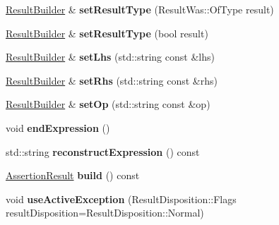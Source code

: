 \begin{DoxyCompactItemize}
\item 
\hypertarget{classCatch_1_1ResultBuilder_af896e372db9d7fc90ddeceff3ad110d0}{
\hyperlink{classCatch_1_1ResultBuilder}{ResultBuilder} \& {\bfseries setResultType} (ResultWas::OfType result)}
\label{classCatch_1_1ResultBuilder_af896e372db9d7fc90ddeceff3ad110d0}

\item 
\hypertarget{classCatch_1_1ResultBuilder_ae504348b073d0360bfd5fc33347ec689}{
\hyperlink{classCatch_1_1ResultBuilder}{ResultBuilder} \& {\bfseries setResultType} (bool result)}
\label{classCatch_1_1ResultBuilder_ae504348b073d0360bfd5fc33347ec689}

\item 
\hypertarget{classCatch_1_1ResultBuilder_a5de584deec90fc6b7cc5bcf9eb636442}{
\hyperlink{classCatch_1_1ResultBuilder}{ResultBuilder} \& {\bfseries setLhs} (std::string const \&lhs)}
\label{classCatch_1_1ResultBuilder_a5de584deec90fc6b7cc5bcf9eb636442}

\item 
\hypertarget{classCatch_1_1ResultBuilder_aaeb41a00cf352c7a0bcf75a0ded0a4a2}{
\hyperlink{classCatch_1_1ResultBuilder}{ResultBuilder} \& {\bfseries setRhs} (std::string const \&rhs)}
\label{classCatch_1_1ResultBuilder_aaeb41a00cf352c7a0bcf75a0ded0a4a2}

\item 
\hypertarget{classCatch_1_1ResultBuilder_a8232ed051ed7f6adfbc152c98aa1dc0c}{
\hyperlink{classCatch_1_1ResultBuilder}{ResultBuilder} \& {\bfseries setOp} (std::string const \&op)}
\label{classCatch_1_1ResultBuilder_a8232ed051ed7f6adfbc152c98aa1dc0c}

\item 
\hypertarget{classCatch_1_1ResultBuilder_a75ac2dbabd8d4b4b3a75de9bbc3abf02}{
void {\bfseries endExpression} ()}
\label{classCatch_1_1ResultBuilder_a75ac2dbabd8d4b4b3a75de9bbc3abf02}

\item 
\hypertarget{classCatch_1_1ResultBuilder_ad34bc9b83d5cbd5d960903e5a3c6c96c}{
std::string {\bfseries reconstructExpression} () const }
\label{classCatch_1_1ResultBuilder_ad34bc9b83d5cbd5d960903e5a3c6c96c}

\item 
\hypertarget{classCatch_1_1ResultBuilder_a31eba48feb02817d2151e31bd8331eeb}{
\hyperlink{classCatch_1_1AssertionResult}{AssertionResult} {\bfseries build} () const }
\label{classCatch_1_1ResultBuilder_a31eba48feb02817d2151e31bd8331eeb}

\item 
\hypertarget{classCatch_1_1ResultBuilder_a5bbd2f14a678f3e8d0f791ac6d233d65}{
void {\bfseries useActiveException} (ResultDisposition::Flags resultDisposition=ResultDisposition::Normal)}
\label{classCatch_1_1ResultBuilder_a5bbd2f14a678f3e8d0f791ac6d233d65}


\end{DoxyCompactItemize}
